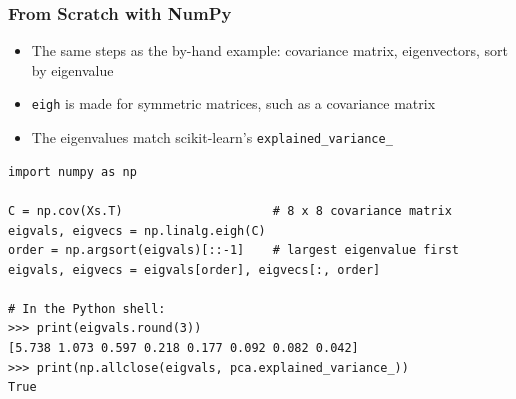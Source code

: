 \begin{frame}[fragile]\frametitle{From Scratch with NumPy}
\begin{itemize}
\item The same steps as the by-hand example: covariance matrix, eigenvectors, sort by eigenvalue
\item \texttt{eigh} is made for symmetric matrices, such as a covariance matrix
\item The eigenvalues match scikit-learn's \texttt{explained\_variance\_}
\end{itemize}
\begin{lstlisting}
import numpy as np

C = np.cov(Xs.T)                     # 8 x 8 covariance matrix
eigvals, eigvecs = np.linalg.eigh(C)
order = np.argsort(eigvals)[::-1]    # largest eigenvalue first
eigvals, eigvecs = eigvals[order], eigvecs[:, order]

# In the Python shell:
>>> print(eigvals.round(3))
[5.738 1.073 0.597 0.218 0.177 0.092 0.082 0.042]
>>> print(np.allclose(eigvals, pca.explained_variance_))
True
\end{lstlisting}
\end{frame}




